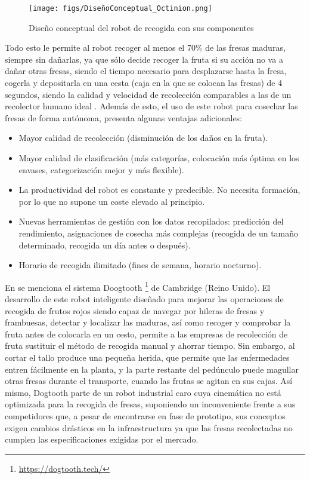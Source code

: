 \begin{figure} [H]
    \begin{center}
      \texttt{[image: figs/DiseñoConceptual\_Octinion.png]}
    \end{center}
    \caption{Diseño conceptual del robot de recogida con sus componentes}
    \label{fig:DiseñoConceptual_Octinion}
\end{figure}

Todo esto le permite al robot recoger al menos el 70\% de las fresas maduras, siempre sin dañarlas, ya que sólo decide recoger la fruta si su acción no va a dañar otras fresas, siendo el tiempo necesario para desplazarse hasta la fresa, cogerla y depositarla en una cesta (caja en la que se colocan las
fresas) de 4 segundos, siendo la calidad y velocidad de recolección comparables a las de un recolector humano ideal \cite{DePreter18}. Además de esto, el uso de este robot para cosechar las fresas de forma autónoma, presenta algunas ventajas adicionales:

\begin{itemize}
    \item Mayor calidad de recolección (disminución de los daños en la fruta).
    \item Mayor calidad de clasificación (más categorías, colocación más óptima 								en los envases, categorización mejor y más flexible).
    \item La productividad del robot es constante y predecible. No necesita formación, por lo que no supone un coste elevado al principio.
    \item Nuevas herramientas de gestión con los datos recopilados: predicción del rendimiento, asignaciones de cosecha más complejas (recogida de un tamaño
determinado, recogida un día antes o después).
    \item Horario de recogida ilimitado (fines de semana, horario nocturno).
\end{itemize}

En \cite{DePreter18} se menciona el sistema Doogtooth \footnote{\url{https://dogtooth.tech/}} de Cambridge (Reino Unido). El desarrollo de este robot inteligente diseñado para mejorar las operaciones de recogida de frutos rojos siendo capaz de navegar por hileras de fresas y frambuesas, detectar y localizar las maduras, así como recoger y comprobar la fruta antes de colocarla en un cesto, permite a las empresas de recolección de fruta sustituir el método de recogida manual y ahorrar tiempo. Sin embargo, al cortar el tallo produce una pequeña herida, que permite que las enfermedades entren fácilmente en la planta, y la parte restante del pedúnculo puede magullar otras fresas durante el transporte, cuando las frutas se agitan en sus cajas. Así mismo, Dogtooth parte de un robot industrial caro cuya cinemática no está optimizada para la recogida de fresas, suponiendo un inconveniente frente a sus competidores que, a pesar de encontrarse en fase de prototipo, sus conceptos exigen cambios drásticos en la infraestructura ya que las fresas recolectadas no cumplen las especificaciones exigidas por el mercado. 






